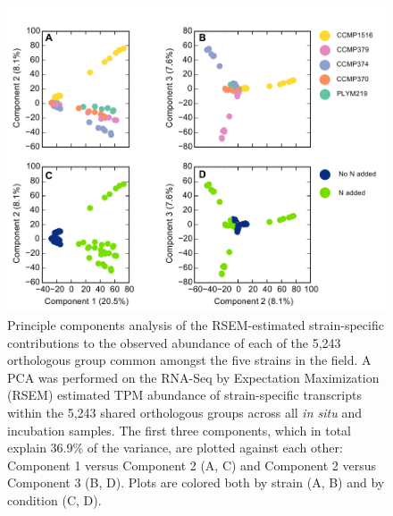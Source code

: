\begin{figure}[h!]
  \centering
    \includegraphics[width=.8\textwidth]{Images/C5_Figure3_PCA.pdf}
    \caption[Principle components analysis of the strain-specific contributions to each of the 5,243 orthologous group common amongst the five strains]{Principle components analysis of the RSEM-estimated strain-specific contributions to the observed abundance of each of the 5,243 orthologous group common amongst the five strains in the field. A PCA was performed on the RNA-Seq by Expectation Maximization (RSEM) estimated TPM abundance of strain-specific transcripts within the 5,243 shared orthologous groups across all \textit{in situ} and incubation samples. The first three components, which in total explain 36.9\% of the variance, are plotted against each other: Component 1 versus Component 2 (A, C) and Component 2 versus Component 3 (B, D). Plots are colored both by strain (A, B) and by condition (C, D).}
  \label{fig:c5f3}
\end{figure}


